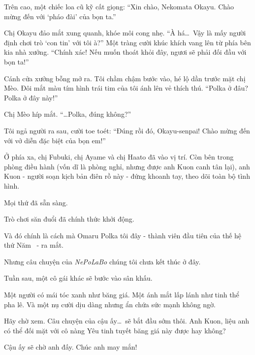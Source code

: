 \documentclass[../main.tex]{subfiles}
\begin{document}
Trên cao, một chiếc loa cũ kỹ cất giọng: ``Xin chào, Nekomata Okayu. Chào mừng đến với `pháo đài' của bọn ta.''

Chị Okayu đảo mắt xung quanh, khóe môi cong nhẹ. ``À há\dots\ Vậy là mấy người định chơi trò `con tin' với tôi à?'' Một tràng cười khúc khích vang lên từ phía bên kia nhà xưởng. ``Chính xác! Nếu muốn thoát khỏi đây, ngươi sẽ phải đối đầu với bọn ta!''

Cánh cửa xưởng bỗng mở ra. Tôi chầm chậm bước vào, hé lộ dần trước mặt chị Mèo. Đôi mắt màu tím hình trái tim của tôi ánh lên vẻ thích thú. ``Polka ở đâu? Polka ở đây này!''

Chị Mèo híp mắt. ``\dots Polka, đúng không?''

Tôi ngả người ra sau, cười toe toét: ``Đúng rồi đó, Okayu-senpai! Chào mừng đến với vở diễn đặc biệt của bọn em!''

Ở phía xa, chị Fubuki, chị Ayame và chị Haato đã vào vị trí. Còn bên trong phòng điều hành (vốn dĩ là phòng nghỉ, nhưng được anh Kuon canh tân lại), anh Kuon - người soạn kịch bản điên rồ này - đứng khoanh tay, theo dõi toàn bộ tình hình.

Mọi thứ đã sẵn sàng.

Trò chơi săn đuổi đã chính thức khởi động.

\il

Và đó chính là cách mà Omaru Polka tôi đây - thành viên đầu tiên của thế hệ thứ Năm \hll\ - ra mắt.

Nhưng câu chuyện của \textit{NePoLaBo} chúng tôi chưa kết thúc ở đây.

Tuần sau, một cô gái khác sẽ bước vào sân khấu.

Một người có mái tóc xanh như băng giá. Một ánh mắt lấp lánh như tinh thể pha lê. Và một nụ cười dịu dàng nhưng ẩn chứa sức mạnh không ngờ.

Hãy chờ xem. Câu chuyện của cậu ấy\dots\ sẽ bắt đầu sớm thôi. Anh Kuon, liệu anh có thể đối mặt với cô nàng Yêu tinh tuyết băng giá này được hay không?

Cậu ấy sẽ chờ anh đấy. Chúc anh may mắn!
\end{document}
